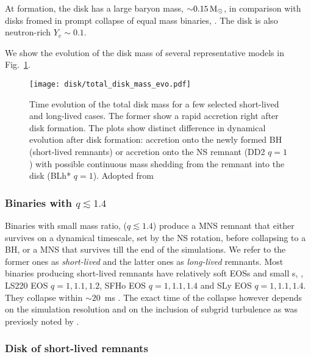 At formation, the disk has a large baryon mass, ${\sim}0.15\,{\text{M}_{\odot}}$, in comparison with 
disks fromed in prompt collapse of equal mass binaries, \citep[\eg][]{Radice:2018pdn}.  
The disk is also neutron-rich $Y_e\sim 0.1$.

We show the evolution of the disk mass of several representative models in Fig.~\ref{fig:disk_mass_evo}.

\begin{figure}[t]
    \centering 
    \texttt{[image: disk/total\_disk\_mass\_evo.pdf]}
    \caption{Time evolution of the total disk mass for a few selected
        short-lived and long-lived cases. The former show a rapid 
        accretion right after disk formation. The plots show
        distinct difference in dynamical evolution after disk formation: accretion onto
        the newly formed BH (short-lived remnants) or accretion onto the NS
        remnant (DD2 $q=1$) with possible continuous mass shedding from the remnant
        into the disk (BLh* $q=1$). Adopted from \citet{Nedora:2020pak}
    } 
    \label{fig:disk_mass_evo}
\end{figure}


\subsubsection*{Binaries with $q\lesssim1.4$}

Binaries with small mass ratio, ($q\lesssim1.4$) produce a \ac{MNS} remnant
that either survives on a dynamical timescale, set by the \ac{NS} rotation, before
collapsing to a \ac{BH}, or a \ac{MNS} that survives till the end of the simulations.
We refer to the former ones as \textit{short-lived} and the latter ones as 
\textit{long-lived} remnants.
%
Most binaries producing short-lived remnants have relatively soft \acp{EOS}
and small \mr{}s, \eg, LS220 \ac{EOS} $q=1,1.1,1.2$, SFHo \ac{EOS} $q=1,1.1,1.4$ 
and SLy \ac{EOS} $q=1,1.1,1.4$. They collapse within $\sim20$~ms \pmerg. 
The exact time of the collapse however depends on the simulation resolution 
and on the inclusion of subgrid turbulence as was previosly noted by \citet{Radice:2017zta}.


\subsubsection*{Disk of short-lived remnants}

